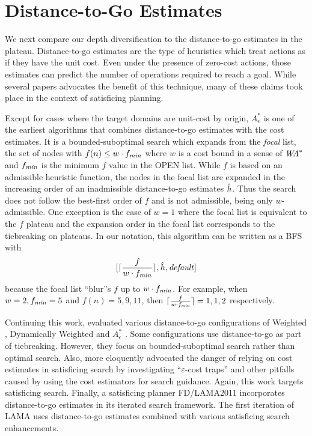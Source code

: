 \clearpage
\section{Distance-to-Go Estimates}

\label{sec:distance-to-go}

We next compare our depth diversification to the distance-to-go
estimates in the plateau.  Distance-to-go estimates are the type of
heuristics which treat actions as if they have the unit cost. Even under
the presence of zero-cost actions, those estimates can predict the
number of operations required to reach a goal.
While several papers advocates the benefit of this technique, many of
these claims took place in the context of satisficing planning.

Except for cases where the target domains are unit-cost by origin, $A^*_\epsilon$ \cite{pearl1982studies} is one of
the earliest algorithms that combines distance-to-go estimates with the cost estimates. It is a bounded-suboptimal
search which expands from the \emph{focal} list, the set of nodes with $f(n)\leq w\cdot f_{\mit{min}}$ where $w$ is
a cost bound in a sense of $\mit{WA}^*$ and $f_{\mit{min}}$ is the minimum $f$ value in the OPEN list.  While $f$
is based on an admissible heuristic function, the nodes in the focal list are expanded in the increasing order of
an inadmissible distance-to-go estimates $\hh$. Thus the search does not follow the best-first order of $f$ and is
not admissible, being only $w$-admissible. One exception is the case of $w=1$ where the focal list is equivalent
to the $f$ plateau and the expansion order in the focal list corresponds to the tiebreaking on plateaus. In our
notation, this algorithm can be written as a BFS with
\[
 [ \lceil \frac{f}{w\cdot f_{\mit{min}}} \rceil, \hh, \mit{default}]
\]
because the focal list ``blur''s $f$ up to $w\cdot f_{\mit{min}}$. For example, when $w=2, f_{\mit{min}}=5$ and
$f(n)=5,9,11$, then $\lceil \frac{f}{w\cdot f_{\mit{min}}} \rceil=1,1,2$ respectively. 

Continuing this work,  evaluated various distance-to-go configurations of Weighted
\astar, Dynamically Weighted \astar \cite{pohl1973avoidance} and $A^*_\epsilon$
\citeyear{thayer2009using,thayer2011bounded}. Some configurations use distance-to-go as part of
tiebreaking. However, they focus on bounded-suboptimal search rather than optimal search.
% 
Also,  \citeyear{cushing2010cost} more eloquently advocated the danger of relying
on cost estimates in satisficing search by investigating ``$\varepsilon$-cost traps'' and other pitfalls caused by
using the cost estimators for search guidance. Again, this work targets satisficing search.
% 
Finally, a \sota satisficing planner FD/LAMA2011 incorporates distance-to-go estimates in its iterated search
framework. The first iteration of LAMA uses distance-to-go estimates combined with various satisficing
search enhancements.

